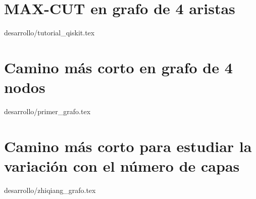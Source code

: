 \section{MAX-CUT en grafo de 4 aristas\label{sec:4-tutorial_de_qiskit}}{desarrollo/tutorial_qiskit.tex}

\section{Camino más corto en grafo de 4 nodos\label{sec:4-primer_grafo}}{desarrollo/primer_grafo.tex}

\section{Camino más corto para estudiar la variación con el número de capas}{desarrollo/zhiqiang_grafo.tex}


